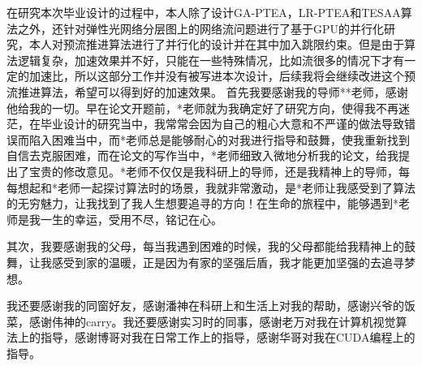 \documentclass[master]{thesis-uestc}
\begin{document}
在研究本次毕业设计的过程中，本人除了设计GA-PTEA，LR-PTEA和TESAA算法之外，还针对弹性光网络分层图上的网络流问题进行了基于GPU的并行化研究，本人对预流推进算法进行了并行化的设计并在其中加入跳限约束。但是由于算法逻辑复杂，加速效果并不好，只能在一些特殊情况，比如流很多的情况下才有一定的加速比，所以这部分工作并没有被写进本次设计，后续我将会继续改进这个预流推进算法，希望可以得到好的加速效果。
\thesisacknowledgement
首先我要感谢我的导师**老师，感谢他给我的一切。早在论文开题前，*老师就为我确定好了研究方向，使得我不再迷茫，在毕业设计的研究当中，我常常会因为自己的粗心大意和不严谨的做法导致错误而陷入困难当中，而*老师总是能够耐心的对我进行指导和鼓舞，使我重新找到自信去克服困难，而在论文的写作当中，*老师细致入微地分析我的论文，给我提出了宝贵的修改意见。*老师不仅仅是我科研上的导师，还是我精神上的导师，每每想起和*老师一起探讨算法时的场景，我就非常激动，是*老师让我感受到了算法的无穷魅力，让我找到了我人生想要追寻的方向！在生命的旅程中，能够遇到*老师是我一生的幸运，受用不尽，铭记在心。

其次，我要感谢我的父母，每当我遇到困难的时候，我的父母都能给我精神上的鼓舞，让我感受到家的温暖，正是因为有家的坚强后盾，我才能更加坚强的去追寻梦想。

我还要感谢我的同窗好友，感谢潘神在科研上和生活上对我的帮助，感谢兴爷的饭菜，感谢伟神的carry。我还要感谢实习时的同事，感谢老万对我在计算机视觉算法上的指导，感谢博哥对我在日常工作上的指导，感谢华哥对我在CUDA编程上的指导。

\end{document}
